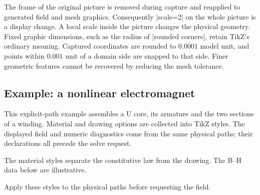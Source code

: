 The frame of the original picture is removed during capture and
reapplied to generated field and mesh graphics. Consequently |scale=2|
on the whole picture is a display change. A local scale inside the
picture changes the physical geometry. Fixed graphic dimensions, such
as the radius of |rounded corners|, retain TikZ's ordinary meaning.
Captured coordinates are rounded to $0.0001$ model unit, and points within
$0.001$ unit of a domain side are snapped to that side. Finer geometric
features cannot be recovered by reducing the mesh tolerance.

\subsection{Example: a nonlinear electromagnet}
This explicit-path example assembles a U core, its armature and the two
sections of a winding. Material and drawing options are collected into
TikZ styles. The displayed field and numeric diagnostics come from the
same physical paths; their declarations all precede the solve request.

The material styles separate the constitutive law from the drawing. The B--H data below are illustrative.


\begin{codeexample}
\end{codeexample}

Apply these styles to the physical paths before requesting the field.


\begin{codeexample}[width=0pt]
\end{codeexample}

